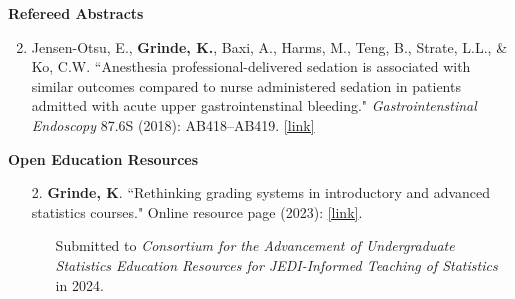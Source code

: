 \documentclass[margin]{res}
\newenvironment{benumerate}[1]{
    \let\oldItem\item
    \def\item{\addtocounter{enumi}{-2}\oldItem}
    
    \begin{enumerate}
    \setcounter{enumi}{#1}
    \addtocounter{enumi}{1}
}{
    \end{enumerate}
}
\begin{document}
\begin{resume}
\textbf{Refereed Abstracts}
\begin{benumerate}{1}
\item Jensen-Otsu, E., \textbf{Grinde, K.}, Baxi, A., Harms, M., Teng, B., Strate, L.L., \& Ko, C.W. 
``Anesthesia professional-delivered sedation is associated with similar outcomes compared to nurse administered sedation in patients admitted with acute upper gastrointenstinal bleeding." \textit{Gastrointenstinal Endoscopy} 87.6S (2018):  AB418--AB419. %
\href{https://www.giejournal.org/article/S0016-5107(18)32182-5/fulltext}{[link]}

\end{benumerate}



\textbf{Open Education Resources}

\begin{itemize}

\item[2.] \textbf{Grinde, K}.  ``Rethinking grading systems in introductory and advanced statistics courses." Online resource page (2023): \href{https://docs.google.com/document/d/e/2PACX-1vRY7IXAvGEoXgH2eRM7YSoo5c7sQr3-_jdGLdndp2thBMqL8WaJvEvdZS6uazbjhKVfLoZiNZmuJNgH/pub}{[link]}. 
\begin{itemize}
\item[] \begin{footnotesize}
Submitted to \textit{Consortium for the Advancement of Undergraduate Statistics Education Resources for JEDI-Informed Teaching of Statistics} in 2024.  
\end{footnotesize}
\end{itemize}


\end{itemize}
\end{resume}
\end{document}
